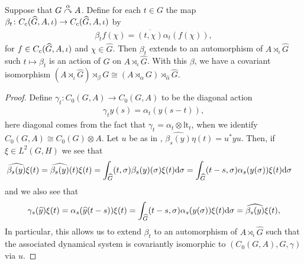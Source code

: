 \begin{proposition}
Suppose that $G \stackrel{\alpha}{\curvearrowright} A$. Define for each $t \in G$ the map $\beta_t \colon C_c( \widehat{G}, A, \iota) \to C_c(\widehat{G}, A, \iota)$ by
\begin{align*}
	\beta_t f(\chi) = \overline{ ( t, \chi)} \alpha_t(f(\chi)),	
\end{align*}
for $f \in C_c(\widehat{G}, A, \iota)$ and $\chi \in \hat G$. Then $\beta_t$ extends to an automorphism of $A \rtimes_{\iota} \hat G$ such $t \mapsto \beta_t$ is an action of $G$ on $A \rtimes_\iota \hat G$. With this $\beta$, we have a covariant isomorphism $(A \rtimes_\iota \hat G) \rtimes_\beta G \cong (A \rtimes_\alpha G) \rtimes_{\hat \alpha} \hat G$. 
\end{proposition}
\begin{proof}
Define $\gamma_t \colon C_0(G,A) \to C_0(G,A)$ to be the diagonal action
\begin{align*}
\gamma_t y(s) = \alpha_t (y(s-t)),
\end{align*}
here diagonal comes from the fact that $\gamma_t = \alpha_t \otimes \mathrm{lt}_t$, when we identify $C_0(G,A) \cong C_0(G) \otimes A$. Let $u$ be as in , $\hat{\beta_s(y)} \eta(t) = u^*yu$. Then, if $\xi \in L^2(G,H)$ we see that
\begin{align*}
\widehat{\beta_s(y)}\xi(t) = \widehat{\beta_s(y)}(t) \xi(t) = \int_{\widehat{G}} (t, \sigma) \beta_s(y)(\sigma) \xi(t) \mathrm{d} \sigma &= \int_{\widehat{G}} (t-s,\sigma) \alpha_s(y(\sigma)) \xi(t) \mathrm{d} \sigma
\end{align*}
and we also see that 
\begin{align*}
\gamma_s (\widehat{y}) \xi(t) = \alpha_{s}(\widehat{y}(t-s)) \xi(t) = \int_{\widehat{G}} (t-s, \sigma) \alpha_s (y (\sigma)) \xi(t) \mathrm{d} \sigma = \widehat{\beta_s(y)} \xi(t),
\end{align*}
In particular, this allows us to extend $\beta_t$ to an automorphism of $A \rtimes_\iota \hat G$ such that the associated dynamical system is covariantly isomorphic to $(C_0(G,A),G,\gamma)$ via $u$.


\end{proof}
